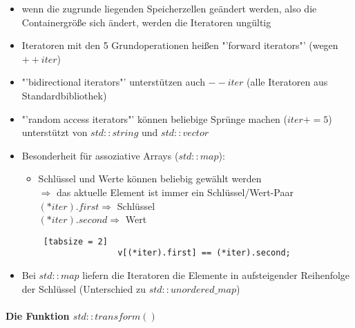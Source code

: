\documentclass{article}
\begin{document}
\begin{itemize}
\begin{lstlisting} [tabsize = 2]
				// Abkuerzung in C++: rang-based for-loop
				for (int & element : v) {
					int current = element;  // lesen
					element = new_value;  // schreiben
				}
			}
		\end{lstlisting}
		\item wenn die zugrunde liegenden Speicherzellen geändert werden, also die Containergröße sich ändert, werden die Iteratoren ungültig
		\item Iteratoren mit den 5 Grundoperationen heißen "'forward iterators"' (wegen $++iter$)
		\item "'bidirectional iterators"' unterstützen auch $--iter$ (alle Iteratoren aus Standardbibliothek)
		\item "'random access iterators"' können beliebige Sprünge machen ($iter+=5$) \\
		unterstützt von $std::string$ und $std::vector$
		\item Besonderheit für assoziative Arrays ($std::map$):
		\begin{itemize}
			\item Schlüssel und Werte können beliebig gewählt werden \\
			$\Rightarrow$ das aktuelle Element ist immer ein Schlüssel/Wert-Paar \\
			$(*iter).first \Rightarrow$ Schlüssel \\
			$(*iter).second \Rightarrow$ Wert
			\begin{lstlisting} [tabsize = 2]
				v[(*iter).first] == (*iter).second;
			\end{lstlisting}
		\end{itemize}
		\item Bei $std::map$ liefern die Iteratoren die Elemente in aufsteigender Reihenfolge der Schlüssel (Unterschied zu $std::unordered\_map$)
	\end{itemize}
	
	\paragraph{Die Funktion $std::transform()$}
	
\end{document}
